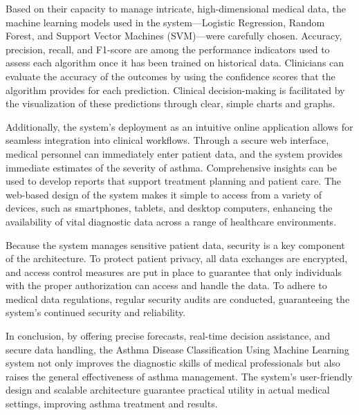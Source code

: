 Based on their capacity to manage intricate, high-dimensional medical data, the machine learning models used in the system—Logistic Regression, Random Forest, and Support Vector Machines (SVM)—were carefully chosen. Accuracy, precision, recall, and F1-score are among the performance indicators used to assess each algorithm once it has been trained on historical data. Clinicians can evaluate the accuracy of the outcomes by using the confidence scores that the algorithm provides for each prediction. Clinical decision-making is facilitated by the visualization of these predictions through clear, simple charts and graphs.

Additionally, the system's deployment as an intuitive online application allows for seamless integration into clinical workflows. Through a secure web interface, medical personnel can immediately enter patient data, and the system provides immediate estimates of the severity of asthma. Comprehensive insights can be used to develop reports that support treatment planning and patient care. The web-based design of the system makes it simple to access from a variety of devices, such as smartphones, tablets, and desktop computers, enhancing the availability of vital diagnostic data across a range of healthcare environments.

Because the system manages sensitive patient data, security is a key component of the architecture. To protect patient privacy, all data exchanges are encrypted, and access control measures are put in place to guarantee that only individuals with the proper authorization can access and handle the data. To adhere to medical data regulations, regular security audits are conducted, guaranteeing the system's continued security and reliability.

In conclusion, by offering precise forecasts, real-time decision assistance, and secure data handling, the Asthma Disease Classification Using Machine Learning system not only improves the diagnostic skills of medical professionals but also raises the general effectiveness of asthma management. The system's user-friendly design and scalable architecture guarantee practical utility in actual medical settings, improving asthma treatment and results.



